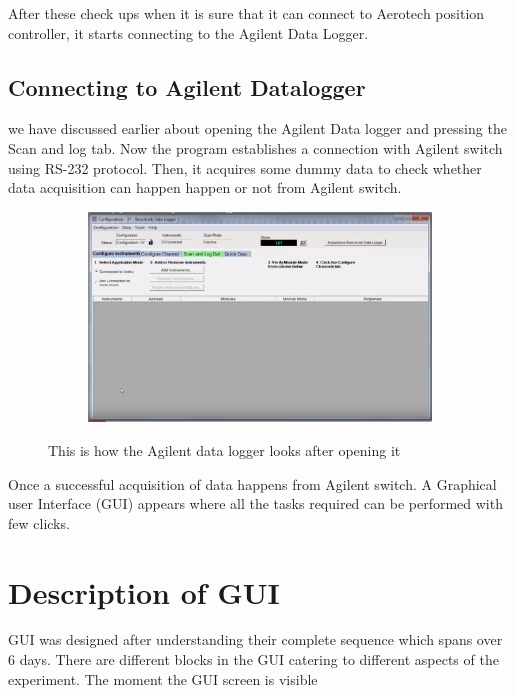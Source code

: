 \documentclass[12pt]{article}
\begin{document}
After these check ups when it is sure that it can connect to Aerotech position controller, it starts connecting to the Agilent Data Logger.
 
 
  \subsection{Connecting to Agilent Datalogger}
 we have discussed earlier about opening the Agilent Data logger and pressing the Scan and log tab. Now the program establishes  a connection with Agilent switch using RS-232 protocol. Then, it acquires some dummy data to check whether data acquisition can happen happen or not from Agilent switch. 
 
 \begin{figure}[H]
 
    \begin{subfigure}{1\textwidth}
    \includegraphics[scale=0.5]{images/datalogger_front.png} 
    \label{fig:DJp1}
    \end{subfigure}
 \caption{This is how the Agilent data logger looks after opening it }
\label{fig6}
\end{figure} 
 
 
 Once a successful acquisition of data happens from Agilent switch. A Graphical user Interface (GUI) appears where all the tasks required can be performed with few clicks.
 
 \section{Description of GUI}
 GUI was designed after understanding their complete sequence which spans over 6 days. There are different blocks in the GUI catering to different aspects of the experiment. The moment the GUI screen is visible   
 
\end{document}
